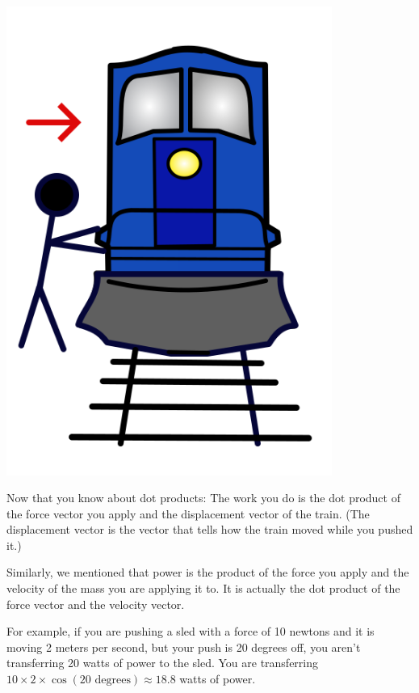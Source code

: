\includegraphics[width=0.8\textwidth]{train.png}


Now that you know about dot products: The work you do is the dot
product of the force vector you apply and the displacement vector of the train. (The displacement
vector is the vector that tells how the train moved while you pushed it.) 

Similarly, we mentioned that power is the product of the force you apply and the velocity of the
mass you are applying it to. It is actually the dot product of the force vector and the velocity vector.

For example, if you are pushing a sled with a force of 10 newtons and it is moving 2 meters per second, 
but your push is 20 degrees off, you aren't transferring 20 watts of power to the sled.  
You are transferring $10 \times 2 \times \cos(20 \text{ degrees}) \approx 18.8$ watts of power.

